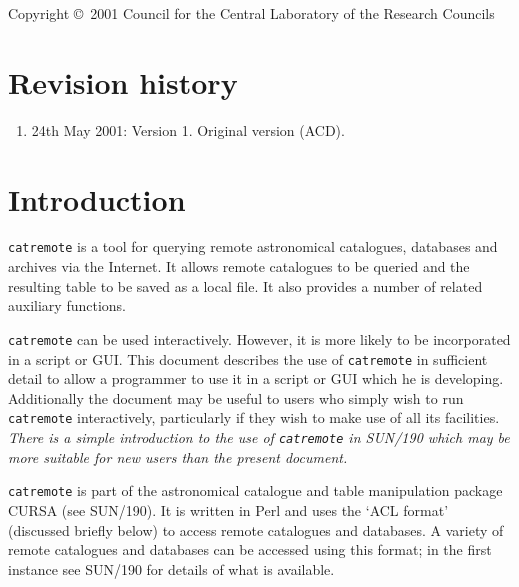 \documentclass[twoside,11pt]{article}
\newcommand{\stardocinitials}  {SSN}
\newcommand{\stardoccopyright}
{Copyright \copyright\ 2001 Council for the Central Laboratory of the Research Councils}
\newcommand{\stardocnumber}    {76.2}
\newcommand{\stardocname}{\stardocinitials /\stardocnumber}
\newenvironment{latexonly}{}{}
\newcommand{\xref}[3]{#1}
\newcommand{\xlabel}[1]{}
\renewcommand{\_}{\texttt{\symbol{95}}}
\renewcommand{\thepage}{\roman{page}}
\begin{document}
 \vspace*{\fill}
 \stardoccopyright

\newpage
\section*{Revision history}

\begin{enumerate}

  \item 24th May 2001: Version 1. Original version (ACD).

\end{enumerate}

\cleardoublepage
\begin{latexonly}
   \setlength{\parskip}{0mm}
   \tableofcontents

   \listoffigures
   \listoftables

   \setlength{\parskip}{\medskipamount}
   \markboth{\stardocname}{\stardocname}
\end{latexonly}
\cleardoublepage
\renewcommand{\thepage}{\arabic{page}}
\setcounter{page}{1}

\section{\xlabel{INTRO}\label{INTRO}Introduction}

{\tt catremote} is a tool for querying remote astronomical catalogues,
databases and archives via the Internet.  It allows remote catalogues
to be queried and the resulting table to be saved as a local file.  It
also provides a number of related auxiliary functions.

{\tt catremote} can be used interactively.  However, it is more likely
to be incorporated in a script or GUI.  This document describes the use
of {\tt catremote} in sufficient detail to allow a programmer to use it
in a script or GUI which he is developing.  Additionally the document may
be useful to users who simply wish to run {\tt catremote} interactively,
particularly if they wish to make use of all its facilities.  {\it There
is a simple introduction to the use of {\tt catremote} in
\xref{SUN/190}{sun190}{}\cite{SUN190} which may be more suitable for new
users than the present document.}

{\tt catremote} is part of the astronomical catalogue and table
manipulation package CURSA (see \xref{SUN/190}{sun190}{}\cite{SUN190}).
It is written in Perl and uses the `ACL format' (discussed briefly below)
to access remote catalogues and databases.   A variety of remote
catalogues and databases can be accessed using this format; in the first
instance see SUN/190 for details of what is available.
\end{document}
